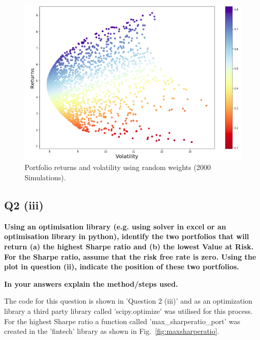 \begin{figure}[H]
\centering
  \includegraphics[scale = .65]{imgs/port_simulation.png}
  \caption{Portfolio returns and volatility using random weights (2000 Simulations).}
  \label{fig:portsimulation}
\end{figure}



\subsection{Q2 (iii)}\label{sssec:pt1q2iii}
\textbf{Using an optimisation library (e.g. using solver in excel or an optimisation library in python),
identify the two portfolios that will return (a) the highest Sharpe ratio and (b) the lowest Value at 
Risk. For the Sharpe ratio, assume that the risk free rate is zero. Using the plot in question (ii), indicate the position of these two portfolios.}

\noindent
\textbf{In your answers explain the method/steps used.}

\noindent
The code for this question is shown in 'Question 2 (iii)' and as an optimization library a third party library called 'scipy.optimize' \cite{python:scipy} was utilised for this process. For the highest Sharpe ratio a function called 'max\_sharperatio\_port' was created in the 'fintech' library as shown in Fig.~\ref{fig:maxsharperatio}. 

